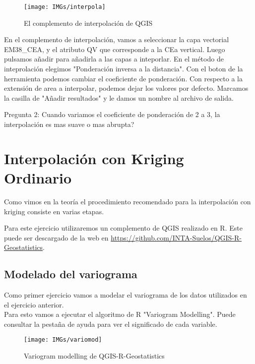 \documentclass[onecolumn]{article}
\begin{document}
\begin{figure}[h]
	\centering
	\texttt{[image: IMGs/interpola]}
	\caption{El complemento de interpolación de QGIS}
\end{figure}

En el complemento de interpolación, vamos a seleccionar la capa vectorial EM38\_CEA, y el atributo QV que corresponde a la CEa vertical. Luego pulsamos añadir para añadirla a las capas a inteporlar.
En el método de inteprolación elegimos "Ponderación inversa a la distancia". Con el boton de la herramienta podemos cambiar el coeficiente de ponderación. 
Con respecto a la extensión de area a interpolar, podemos dejar los valores por defecto. Marcamos la casilla de "Añadir resultados" y le damos un nombre al archivo de salida.

\begin{mdframed}[]
	Pregunta 2: Cuando variamos el coeficiente de ponderación de 2 a 3, la interpolación es mas suave o mas abrupta? 
\end{mdframed}

\section{Interpolación con Kriging Ordinario}

Como vimos en la teoría el procedimiento recomendado para la interpolación con kriging consiste en varias etapas.

Para este ejercicio utilizaremos un complemento de QGIS realizado en R. Este puede ser descargado de la web en  \url{https://github.com/INTA-Suelos/QGIS-R-Geostatistics}.

\subsection{Modelado del variograma}

Como primer ejercicio vamos a modelar el variograma de los datos utilizados en el ejercicio anterior.\\

Para esto vamos a ejecutar el algoritmo de R "Variogram Modelling". Puede consultar la pestaña de ayuda para ver el significado de cada variable. 

\begin{figure}[h]
	\centering
	\texttt{[image: IMGs/variomod]}
	\caption{Variogram modelling de QGIS-R-Geostatistics}
\end{figure}
\end{document}

